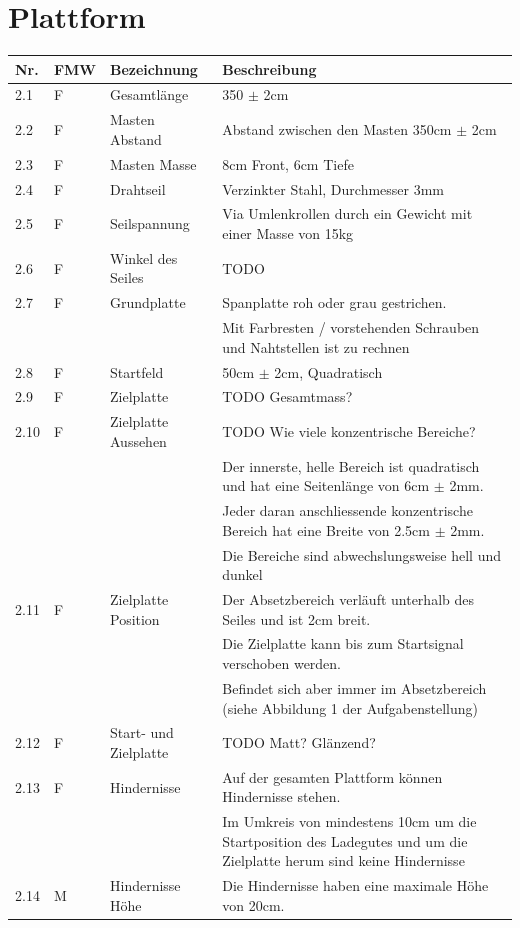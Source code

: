\documentclass[a4paper]{report}
\begin{document}
\section{Plattform}
\begin{tabular}{|p{}|p{}|p{}|p{}|}
	\hline
	\textbf{Nr.} & \textbf{FMW\footnotemark} & \textbf{Bezeichnung} & \textbf{Beschreibung} \\
	\hline
	2.1 & F & Gesamtlänge & 350 $\pm$ 2cm \\
	\hline
	2.2 & F & Masten Abstand & Abstand zwischen den Masten 350cm $\pm$ 2cm \\
	\hline
	2.3 & F & Masten Masse & 8cm Front, 6cm Tiefe \\
	\hline
	2.4 & F & Drahtseil & Verzinkter Stahl, Durchmesser 3mm \\
	\hline
	2.5 & F & Seilspannung & Via Umlenkrollen durch ein Gewicht mit einer Masse von 15kg \\
	\hline
	2.6 & F & Winkel des Seiles & TODO \\
	\hline
	2.7 & F & Grundplatte & Spanplatte roh oder grau gestrichen.\\
	& & & Mit Farbresten / vorstehenden Schrauben und Nahtstellen ist zu rechnen \\
	\hline
	2.8 & F & Startfeld & 50cm $\pm$ 2cm, Quadratisch \\
	\hline
	2.9 & F & Zielplatte & TODO Gesamtmass? \\
	\hline
	2.10 & F & Zielplatte Aussehen & TODO Wie viele konzentrische Bereiche?\\
	& & & Der innerste, helle Bereich ist quadratisch und hat eine Seitenlänge von 6cm $\pm$ 2mm. \\
	& & & Jeder daran anschliessende konzentrische Bereich hat eine Breite von 2.5cm $\pm$ 2mm. \\
	& & & Die Bereiche sind abwechslungsweise hell und dunkel \\
	\hline
	2.11 & F & Zielplatte Position & Der Absetzbereich verläuft unterhalb des Seiles und ist 2cm breit.\\
	& & & Die Zielplatte kann bis zum Startsignal verschoben werden.\\
	& & & Befindet sich aber immer im Absetzbereich (siehe Abbildung 1 der Aufgabenstellung) \\
	\hline
	2.12 & F & Start- und Zielplatte & TODO Matt? Glänzend? \\
	\hline
	2.13 & F & Hindernisse & Auf der gesamten Plattform können Hindernisse stehen.\\
	& & & Im Umkreis von mindestens 10cm um die Startposition des Ladegutes und um die Zielplatte herum sind keine Hindernisse \\
	\hline
	2.14 & M & Hindernisse Höhe & Die Hindernisse haben eine maximale Höhe von 20cm. \\
	\hline
\end{tabular}
\end{document}
